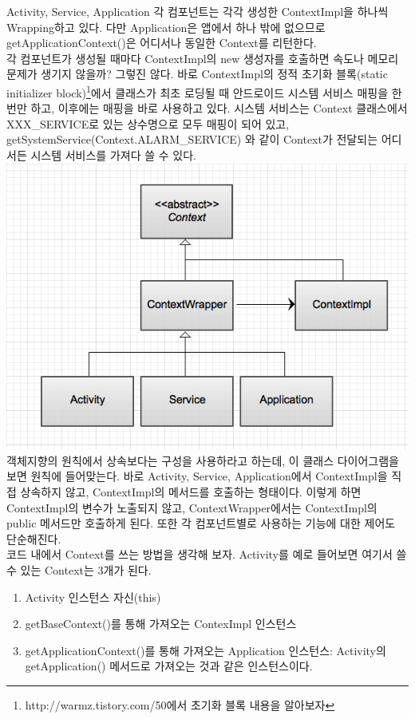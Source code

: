 Activity, Service, Application 각 컴포넌트는 각각 생성한 ContextImpl을 하나씩 Wrapping하고 있다. 다만 Application은 앱에서 하나 밖에 없으므로 getApplicationContext()은 어디서나 동일한 Context를 리턴한다.\\

각 컴포넌트가 생성될 때마다 ContextImpl의 new 생성자를 호출하면 속도나 메모리 문제가 생기지 않을까? 그렇진 않다. 바로 ContextImpl의 정적 초기화 블록(static initializer block)\footnote{http://warmz.tistory.com/50에서 초기화 블록 내용을 알아보자}에서 클래스가 최초 로딩될 때 안드로이드 시스템 서비스 매핑을 한번만 하고, 이후에는 매핑을 바로 사용하고 있다.
시스템 서비스는 Context 클래스에서 XXX\_SERVICE로 있는 상수명으로 모두 매핑이 되어 있고, getSystemService(Context.ALARM\_SERVICE) 와 같이 Context가 전달되는 어디서든 시스템 서비스를 가져다 쓸 수 있다.\\

\includegraphics[scale=0.5]{context}\\
객체지향의 원칙에서 상속보다는 구성을 사용하라고 하는데, 이 클래스 다이어그램을 보면 원칙에 들어맞는다.
바로 Activity, Service, Application에서 ContextImpl을 직접 상속하지 않고, ContextImpl의 메서드를 호출하는 형태이다. 이렇게 하면 ContextImpl의 변수가 노출되지 않고, ContextWrapper에서는 ContextImpl의 public 메서드만 호출하게 된다. 또한 각 컴포넌트별로 사용하는 기능에 대한 제어도 단순해진다.\\

코드 내에서 Context를 쓰는 방법을 생각해 보자.
Activity를 예로 들어보면 여기서 쓸 수 있는 Context는 3개가 된다. 
\begin{enumerate}
\item Activity 인스턴스 자신(this)
\item getBaseContext()를 통해 가져오는 ContexImpl 인스턴스
\item getApplicationContext()를 통해 가져오는 Application 인스턴스: Activity의 getApplication() 메서드로 가져오는 것과 같은 인스턴스이다.
\end{enumerate}

